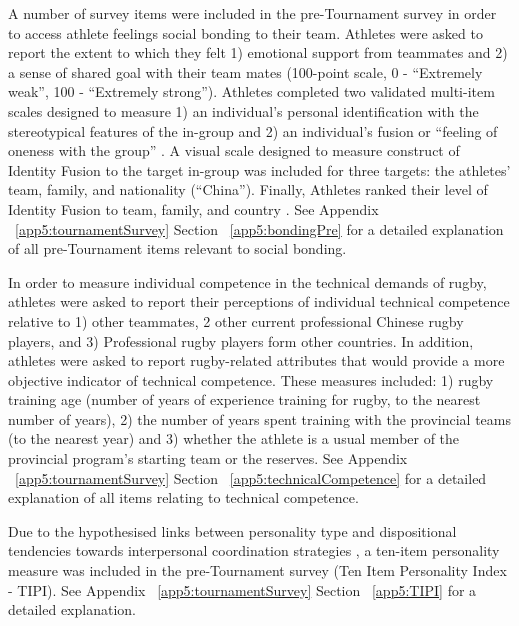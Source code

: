 A number of survey items were included in the pre-Tournament survey in order to access athlete feelings social bonding to their team.  Athletes were asked to report the extent to which they felt 1) emotional support from teammates and 2) a sense of shared goal with their team mates (100-point scale, 0 - ``Extremely weak'', 100 - ``Extremely strong'').  Athletes completed two validated multi-item scales designed to measure 1) an individual's personal identification with the stereotypical features of the in-group \citep[Group Identification Verbal Scale, see][]{Mael1992} and 2) an individual's fusion or ``feeling of oneness with the group'' \citep[Identity Fusion Verbal Scale, see][]{Swann2009}. A visual scale designed to measure construct of Identity Fusion to the target in-group \citep{Swann2009} was included for three targets: the athletes' team, family, and nationality (``China'').  Finally,  Athletes ranked their level of Identity Fusion to team, family, and country \citep[replicating][]{Whitehouse2014}.  See Appendix ~\ref{app5:tournamentSurvey} Section ~\ref{app5:bondingPre} for a detailed explanation of all pre-Tournament items relevant to social bonding.

In order to measure individual competence in the technical demands of rugby, athletes were asked to report their perceptions of individual technical competence relative to 1) other teammates, 2 other current professional Chinese rugby players, and  3) Professional rugby players form other countries.  In addition, athletes were asked to report rugby-related attributes that would provide a more objective indicator of technical competence. These measures included: 1) rugby training age (number of years of experience training for rugby, to the nearest number of years), 2) the number of years spent training with the provincial teams (to the nearest year) and 3) whether the athlete is a usual member of the provincial program's starting team or the reserves.  See Appendix ~\ref{app5:tournamentSurvey} Section ~\ref{app5:technicalCompetence} for a detailed explanation of all items relating to technical competence.

Due to the hypothesised links between personality type and dispositional tendencies towards interpersonal coordination strategies \citep[see for example][]{Marsh2009}, a ten-item personality measure was included in the pre-Tournament survey (Ten Item Personality Index - TIPI)\citep{Gosling2003}. See Appendix ~\ref{app5:tournamentSurvey} Section ~\ref{app5:TIPI} for a detailed explanation.

